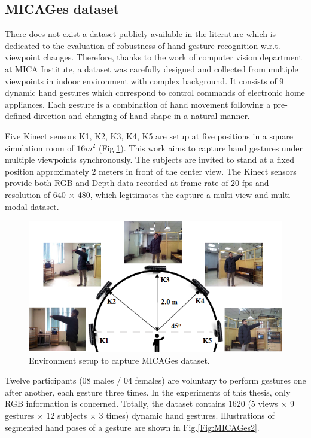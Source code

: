 
\subsection{MICAGes dataset}
    There does not exist a dataset publicly available in the literature which is dedicated to the evaluation of robustness of hand gesture recognition w.r.t. viewpoint changes.
    Therefore, thanks to the work of computer vision department at MICA Institute, a dataset was carefully designed and collected from multiple viewpoints in indoor environment with complex background.
    It consists of 9 dynamic hand gestures which correspond to control commands of electronic home appliances.
    Each gesture is a combination of hand movement following a pre-defined direction and changing of hand shape in a natural manner.

    Five Kinect sensors {K1, K2, K3, K4, K5} are setup at five positions in a square simulation room of $16m^2$ (Fig.\ref{Fig:MICAGes1}).
    This work aims to capture hand gestures under multiple viewpoints synchronously. The subjects are invited to stand at a fixed position approximately 2 meters in front of the center view.
    The Kinect sensors provide both RGB and Depth data recorded at frame rate of 20 fps and resolution of 640 $\times$ 480, which legitimates the capture a multi-view and multi-modal dataset.

    \begin{figure}[h]
        \centering
        \includegraphics[width=0.8\linewidth]{figs/MICAGes1.png}
        \caption{Environment setup to capture MICAGes dataset.}
        \label{Fig:MICAGes1}
    \end{figure}

    Twelve participants (08 males / 04 females) are voluntary to perform gestures one after another, each gesture three times.
    In the experiments of this thesis, only RGB information is concerned.
    Totally, the dataset contains 1620 (5 views $\times$ 9 gestures $\times$ 12 subjects $\times$ 3 times) dynamic hand gestures.
    Illustrations of segmented hand poses of a gesture are shown in Fig.\ref{Fig:MICAGes2}.

